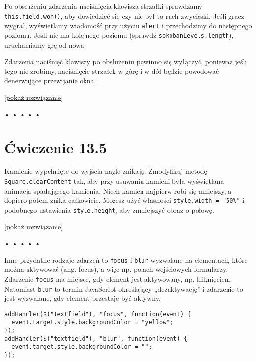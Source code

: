 Po obsłużeniu zdarzenia naciśnięcia klawisza strzałki sprawdzamy \texttt{this.field.won()}, aby dowiedzieć się czy nie był to ruch zwycięski. Jeśli gracz wygrał, wyświetlamy wiadomość przy użyciu \texttt{alert} i przechodzimy do następnego poziomu. Jeśli nie ma kolejnego poziomu (sprawdź \texttt{sokobanLevels.length}), uruchamiamy grę od nowa.

    
Zdarzenia naciśnięć klawiszy po obsłużeniu powinno się wyłączyć, ponieważ jeśli tego nie zrobimy, naciśnięcie strzałek w górę i w dół będzie powodować denerwujące przewijanie okna.

  
[\hyperref[sol:13.4]{pokaż rozwiązanie}]
  


\begin{center}
• • • • •
\end{center}

  
\section*{Ćwiczenie 13.5}
\label{sec:13.5}
  
    
Kamienie wypchnięte do wyjścia nagle znikają. Zmodyfikuj metodę \texttt{Square.clearContent} tak, aby przy usuwaniu kamieni była wyświetlana animacja spadającego kamienia. Niech kamień najpierw robi się mniejszy, a dopiero potem znika całkowicie. Możesz użyć własności \texttt{style.width = "50\%"} i podobnego ustawienia \texttt{style.height}, aby zmniejszyć obraz o połowę.

  
[\hyperref[sol:13.5]{pokaż rozwiązanie}]
  


\begin{center}
• • • • •
\end{center}

  
Inne przydatne rodzaje zdarzeń to \texttt{focus} i \texttt{blur} wyzwalane na elementach, które można aktywować (ang. focus), a więc np. polach wejściowych formularzy. Zdarzenie \texttt{focus} ma miejsce, gdy element jest aktywowany, np. kliknięciem. Natomiast \texttt{blur} to termin JavaScript określający „dezaktywację” i zdarzenie to jest wyzwalane, gdy element przestaje być aktywny.

  
\begin{verbatim} 
addHandler($("textfield"), "focus", function(event) {
  event.target.style.backgroundColor = "yellow";
});
addHandler($("textfield"), "blur", function(event) {
  event.target.style.backgroundColor = "";
});
 \end{verbatim}
  
